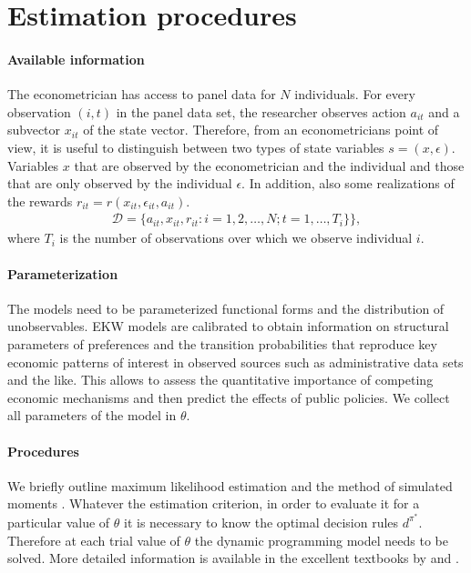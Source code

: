 \section{Estimation procedures}\label{Estimation}
\paragraph{Available information} The econometrician has access to panel data for $N$ individuals. For every observation $(i, t)$ in the panel data set, the researcher observes action $a_{it}$ and a subvector $x_{it}$ of the state vector. Therefore, from an econometricians point of view, it is useful to distinguish between two types of state variables $s = (x, \epsilon)$. Variables $x$ that are observed by the econometrician and the individual and those that are only observed by the individual $\epsilon$.  In addition, also some realizations of the rewards $r_{it} = r(x_{it}, \epsilon_{it}, a_{it})$.
%
\begin{align*}
  \mathcal{D} = \{a_{it}, x_{it}, r_{it}: i = 1,2, \hdots, N; t = 1, \hdots, T_i\}
  \},
\end{align*}
where $T_i$ is the number of observations over which we observe individual $i$.

\paragraph{Parameterization} The models need to be parameterized functional forms and the distribution of unobservables. EKW models are calibrated to obtain information on structural parameters of preferences and the transition probabilities that reproduce key economic patterns of interest in observed sources such as administrative data sets and the like. This allows to assess the quantitative importance of competing economic mechanisms and then predict the effects of public policies. We collect all parameters of the model in $\theta$.

\paragraph{Procedures} We briefly outline maximum likelihood estimation \citep{Fisher.1922} and the method of simulated moments \citep{McFadden.1989}.  Whatever the estimation criterion, in order to evaluate it for a particular value of $\theta$  it is necessary to know the optimal decision rules $d^{\pi^*}$. Therefore at each trial value of $\theta$ the dynamic programming model needs to be solved. More detailed information is available in the excellent textbooks by \citet{Davidson.2003} and \citet{Gourieroux.1996}.

